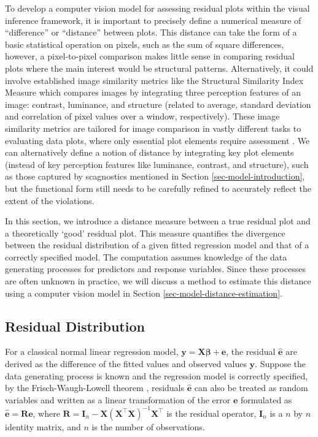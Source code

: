 \documentclass[]{interact}
\theoremstyle{plain}%
\theoremstyle{definition}
\theoremstyle{remark}
\begin{document}
To develop a computer vision model for assessing residual plots within
the visual inference framework, it is important to precisely define a
numerical measure of ``difference'' or ``distance'' between plots. This
distance can take the form of a basic statistical operation on pixels,
such as the sum of square differences, however, a pixel-to-pixel
comparison makes little sense in comparing residual plots where the main
interest would be structural patterns. Alternatively, it could involve
established image similarity metrics like the Structural Similarity
Index Measure \citep{wang2004image} which compares images by integrating
three perception features of an image: contrast, luminance, and
structure (related to average, standard deviation and correlation of
pixel values over a window, respectively). These image similarity
metrics are tailored for image comparison in vastly different tasks to
evaluating data plots, where only essential plot elements require
assessment \citep{chowdhury2018measuring}. We can alternatively define a
notion of distance by integrating key plot elements (instead of key
perception features like luminance, contrast, and structure), such as
those captured by scagnostics mentioned in Section
\ref{sec-model-introduction}, but the functional form still needs to be
carefully refined to accurately reflect the extent of the violations.

In this section, we introduce a distance measure between a true residual
plot and a theoretically `good' residual plot. This measure quantifies
the divergence between the residual distribution of a given fitted
regression model and that of a correctly specified model. The
computation assumes knowledge of the data generating processes for
predictors and response variables. Since these processes are often
unknown in practice, we will discuss a method to estimate this distance
using a computer vision model in Section
\ref{sec-model-distance-estimation}.

\subsection{Residual Distribution}\label{residual-distribution}

For a classical normal linear regression model,
\(\boldsymbol{y} = \boldsymbol{X}\boldsymbol{\beta} + \boldsymbol{e}\),
the residual \(\hat{\boldsymbol{e}}\) are derived as the difference of
the fitted values and observed values \(\boldsymbol{y}\). Suppose the
data generating process is known and the regression model is correctly
specified, by the Frisch-Waugh-Lowell theorem \citep{frisch1933partial},
residuals \(\hat{\boldsymbol{e}}\) can also be treated as random
variables and written as a linear transformation of the error
\(\boldsymbol{e}\) formulated as
\(\hat{\boldsymbol{e}} = \boldsymbol{R}\boldsymbol{e}\), where
\(\boldsymbol{R}=\boldsymbol{I}_n -\boldsymbol{X}(\boldsymbol{X}^\top\boldsymbol{X})^{-1}\boldsymbol{X}^\top\)
is the residual operator, \(\boldsymbol{I}_n\) is a \(n\) by \(n\)
identity matrix, and \(n\) is the number of observations.
\end{document}
